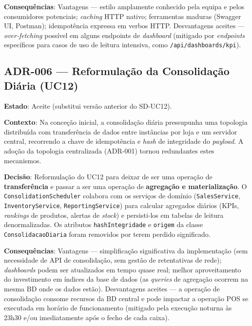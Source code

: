 \noindent\textbf{Consequências}: Vantagens --- estilo amplamente conhecido pela equipa e pelos consumidores potenciais; \textit{caching} HTTP nativo; ferramentas maduras (Swagger UI, Postman); idempotência expressa em verbos HTTP. Desvantagens aceites --- \textit{over-fetching} possível em alguns endpoints de \textit{dashboard} (mitigado por \textit{endpoints} específicos para casos de uso de leitura intensiva, como \texttt{/api/dashboards/kpi}).

\subsection*{ADR-006 --- Reformulação da Consolidação Diária (UC12)}

\noindent\textbf{Estado}: Aceite (substitui versão anterior do SD-UC12).

\noindent\textbf{Contexto}: Na conceção inicial, a consolidação diária pressupunha uma topologia distribuída com transferência de dados entre instâncias por loja e um servidor central, recorrendo a chave de idempotência e \textit{hash} de integridade do \textit{payload}. A adoção da topologia centralizada (ADR-001) tornou redundantes estes mecanismos.

\noindent\textbf{Decisão}: Reformulação do UC12 para deixar de ser uma operação de \textbf{transferência} e passar a ser uma operação de \textbf{agregação e materialização}. O \texttt{ConsolidationScheduler} colabora com os serviços de domínio (\texttt{SalesService}, \texttt{InventoryService}, \texttt{ReportingService}) para calcular agregados diários (KPIs, \textit{rankings} de produtos, alertas de \textit{stock}) e persisti-los em tabelas de leitura denormalizadas. Os atributos \texttt{hashIntegridade} e \texttt{origem} da classe \texttt{ConsolidacaoDiaria} foram removidos por terem perdido significado.

\noindent\textbf{Consequências}: Vantagens --- simplificação significativa da implementação (sem necessidade de API de consolidação, sem gestão de retentativas de rede); \textit{dashboards} podem ser atualizados em tempo quase real; melhor aproveitamento do investimento em índices da base de dados (as \textit{queries} de agregação ocorrem na mesma BD onde os dados estão). Desvantagens aceites --- a operação de consolidação consome recursos da BD central e pode impactar a operação POS se executada em horário de funcionamento (mitigado pela execução noturna às 23h30 e/ou imediatamente após o fecho de cada caixa).


